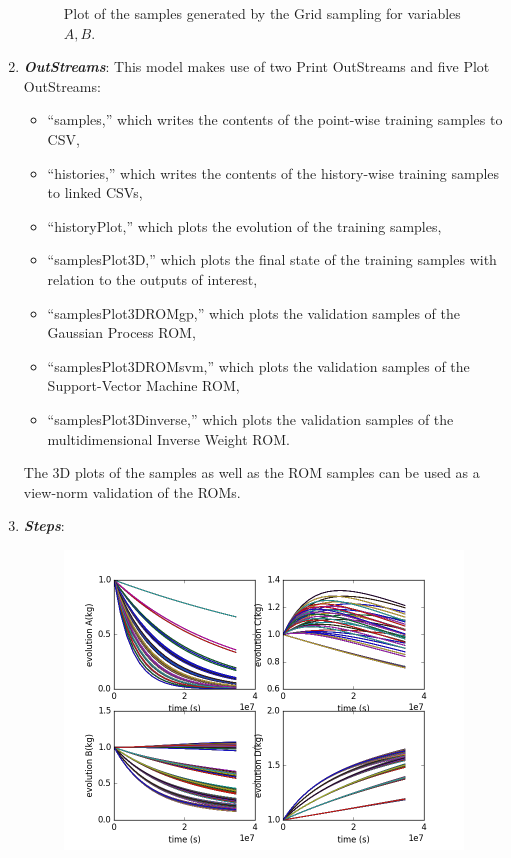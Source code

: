 \begin{enumerate}
\begin{figure}[h!]
  \caption{Plot of the samples generated by the Grid sampling for variables $A,B$.}
  \label{fig:ROMgrid_pointsets}
 \end{figure}
   \item \textbf{\textit{OutStreams}}:
     This model makes use of two Print OutStreams and five Plot OutStreams:
     \begin{itemize}
       \item ``samples,'' which writes the contents of the point-wise training samples to CSV,
       \item ``histories,'' which writes the contents of the history-wise training samples to linked CSVs,
       \item ``historyPlot,'' which plots the evolution of the training samples,
       \item ``samplesPlot3D,'' which plots the final state of the training samples with relation to the
         outputs of interest,
       \item ``samplesPlot3DROMgp,'' which plots the validation samples of the Gaussian Process ROM,
       \item ``samplesPlot3DROMsvm,'' which plots the validation samples of the Support-Vector Machine ROM,
       \item ``samplesPlot3Dinverse,'' which plots the validation samples of the multidimensional Inverse
         Weight ROM.
     \end{itemize}
     The 3D plots of the samples as well as the ROM samples can be used as a view-norm validation of the ROMs.
   \item \textbf{\textit{Steps}}:
 \begin{figure}[h!]
  \centering
  \includegraphics[scale=0.7]{../../tests/framework/user_guide/ReducedOrderModeling/gold/ROMConstruction/1-historyPlot_line-line-line-line.png}

\end{figure}
\end{enumerate}
